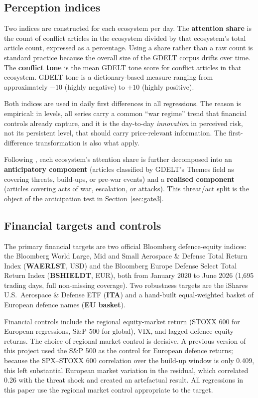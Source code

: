 \documentclass[12pt,a4paper]{article}
\begin{document}
\subsection{Perception indices}

Two indices are constructed for each ecosystem per day. The \textbf{attention share} is the count of conflict articles in the ecosystem divided by that ecosystem's total article count, expressed as a percentage. Using a share rather than a raw count is standard practice \citep{baker2016} because the overall size of the GDELT corpus drifts over time. The \textbf{conflict tone} is the mean GDELT tone score for conflict articles in that ecosystem. GDELT tone is a dictionary-based measure ranging from approximately $-10$ (highly negative) to $+10$ (highly positive).

Both indices are used in daily first differences in all regressions. The reason is empirical: in levels, all series carry a common ``war regime'' trend that financial controls already capture, and it is the day-to-day \textit{innovation} in perceived risk, not its persistent level, that should carry price-relevant information. The first-difference transformation is also what \citet{bondarenko2024} apply.

Following \citet{caldara2022}, each ecosystem's attention share is further decomposed into an \textbf{anticipatory component} (articles classified by GDELT's Themes field as covering threats, build-ups, or pre-war events) and a \textbf{realised component} (articles covering acts of war, escalation, or attacks). This threat/act split is the object of the anticipation test in Section~\ref{sec:gate3}.

\subsection{Financial targets and controls}

The primary financial targets are two official Bloomberg defence-equity indices: the Bloomberg World Large, Mid and Small Aerospace \& Defense Total Return Index (\textbf{WAERLST}, USD) and the Bloomberg Europe Defense Select Total Return Index (\textbf{BSHIELDT}, EUR), both from January 2020 to June 2026 (1,695 trading days, full non-missing coverage). Two robustness targets are the iShares U.S.\ Aerospace \& Defense ETF (\textbf{ITA}) and a hand-built equal-weighted basket of European defence names (\textbf{EU basket}).

Financial controls include the regional equity-market return (STOXX 600 for European regressions, S\&P 500 for global), VIX, and lagged defence-equity returns. The choice of regional market control is decisive. A previous version of this project used the S\&P 500 as the control for European defence returns; because the SPX--STOXX 600 correlation over the build-up window is only 0.409, this left substantial European market variation in the residual, which correlated 0.26 with the threat shock and created an artefactual result. All regressions in this paper use the regional market control appropriate to the target.
\end{document}
